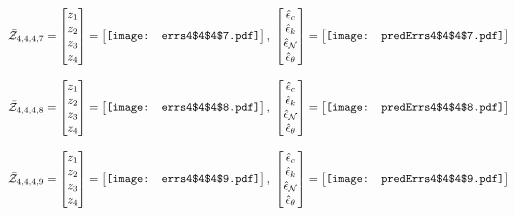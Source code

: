 \documentclass[12pt]{article}
\begin{document}
\begin{gather*}
\bar{\mathcal{Z}}_{4,4,4,7}=\begin{bmatrix}
z_1\\
z_2\\
z_3\\
z_4
 \end{bmatrix}= \begin{bmatrix}
\vcenter{\hbox{\texttt{[image: errs4\$4\$4\$7.pdf]}}}
 \end{bmatrix},\,\, \begin{bmatrix}
\hat{\epsilon}_c\\\hat{\epsilon}_k\\\hat{\epsilon}_\mathcal{N}\\\hat{\epsilon}_\theta
 \end{bmatrix}=\begin{bmatrix}
\vcenter{\hbox{\texttt{[image: predErrs4\$4\$4\$7.pdf]}}}
 \end{bmatrix}
\end{gather*}


\begin{gather*}
\bar{\mathcal{Z}}_{4,4,4,8}=\begin{bmatrix}
z_1\\
z_2\\
z_3\\
z_4
 \end{bmatrix}= \begin{bmatrix}
\vcenter{\hbox{\texttt{[image: errs4\$4\$4\$8.pdf]}}}
 \end{bmatrix},\,\, \begin{bmatrix}
\hat{\epsilon}_c\\\hat{\epsilon}_k\\\hat{\epsilon}_\mathcal{N}\\\hat{\epsilon}_\theta
 \end{bmatrix}=\begin{bmatrix}
\vcenter{\hbox{\texttt{[image: predErrs4\$4\$4\$8.pdf]}}}
 \end{bmatrix}
\end{gather*}



\begin{gather*}
\bar{\mathcal{Z}}_{4,4,4,9}=\begin{bmatrix}
z_1\\
z_2\\
z_3\\
z_4
 \end{bmatrix}= \begin{bmatrix}
\vcenter{\hbox{\texttt{[image: errs4\$4\$4\$9.pdf]}}}
 \end{bmatrix},\,\, \begin{bmatrix}
\hat{\epsilon}_c\\\hat{\epsilon}_k\\\hat{\epsilon}_\mathcal{N}\\\hat{\epsilon}_\theta
 \end{bmatrix}=\begin{bmatrix}
\vcenter{\hbox{\texttt{[image: predErrs4\$4\$4\$9.pdf]}}}
 \end{bmatrix}
\end{gather*}
\end{document}
